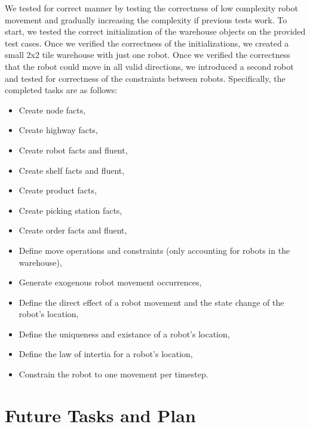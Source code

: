 \documentclass[letterpaper]{article} %
\begin{document}
We tested for correct manner by testing the correctness of low complexity robot movement and gradually increasing the complexity if previous tests work. To start, we tested the correct initialization of the warehouse objects on the provided test cases. Once we verified the correctness of the initializations, we created a small 2x2 tile warehouse with just one robot. Once we verified the correctness that the robot could move in all valid directions, we introduced a second robot and tested for correctness of the constraints between robots. Specifically, the completed tasks are as follows:
\begin{itemize}
\item Create node facts,
\item Create highway facts,
\item Create robot facts and fluent,
\item Create shelf facts and fluent,
\item Create product facts,
\item Create picking station facts,
\item Create order facts and fluent,
\item Define move operations and constraints (only accounting for robots in the warehouse),
\item Generate exogenous robot movement occurrences,
\item Define the direct effect of a robot movement and the state change of the robot's location,
\item Define the uniqueness and existance of a robot's location,
\item Define the law of intertia for a robot's location,
\item Constrain the robot to one movement per timestep.
\end{itemize}

\section{Future Tasks and Plan}
\end{document}
